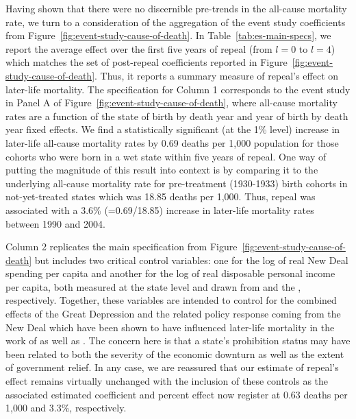 \documentclass[12pt]{article}
\begin{document}
Having shown that there were no discernible pre-trends in the all-cause mortality rate, we turn to a consideration of the aggregation of the event study coefficients from Figure~\ref{fig:event-study-cause-of-death}. 
In Table~\ref{tab:es-main-specs}, we report the average effect over the first five years of repeal (from $l = 0$ to $l = 4$) which matches the set of post-repeal coefficients reported in Figure~\ref{fig:event-study-cause-of-death}. 
Thus, it reports a summary measure of repeal's effect on later-life mortality. 
The specification for Column 1 corresponds to the event study in Panel A of Figure~\ref{fig:event-study-cause-of-death}, where all-cause mortality rates are a function of the state of birth by death year and year of birth by death year fixed effects. 
We find a statistically significant (at the 1\% level) increase in later-life all-cause mortality rates by 0.69 deaths per 1,000 population for those cohorts who were born in a wet state within five years of repeal. 
One way of putting the magnitude of this result into context is by comparing it to the underlying all-cause mortality rate for pre-treatment (1930-1933) birth cohorts in not-yet-treated states which was 18.85 deaths per 1,000. 
Thus, repeal was associated with a 3.6\% (=0.69/18.85) increase in later-life mortality rates between 1990 and 2004.

Column 2 replicates the main specification from Figure~\ref{fig:event-study-cause-of-death} but includes two critical control variables: one for the log of real New Deal spending per capita and another for the log of real disposable personal income per capita, both measured at the state level and drawn from  and the , respectively. 
Together, these variables are intended to control for the combined effects of the Great Depression and the related policy response coming from the New Deal which have been shown to have influenced later-life mortality in the work of  as well as . 
The concern here is that a state's prohibition status may have been related to both the severity of the economic downturn as well as the extent of government relief. 
In any case, we are reassured that our estimate of repeal's effect remains virtually unchanged with the inclusion of these controls as the associated estimated coefficient and percent effect now register at 0.63 deaths per 1,000 and 3.3\%, respectively. 
\end{document}
